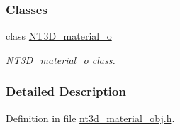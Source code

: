 \subsubsection*{Classes}
\begin{DoxyCompactItemize}
\item 
class \hyperlink{class_n_t3_d__material__o}{NT3D\_\-material\_\-o}
\begin{DoxyCompactList}\small\item\em \hyperlink{class_n_t3_d__material__o}{NT3D\_\-material\_\-o} class. \item\end{DoxyCompactList}\end{DoxyCompactItemize}


\subsubsection{Detailed Description}


Definition in file \hyperlink{nt3d__material__obj_8h_source}{nt3d\_\-material\_\-obj.h}.

